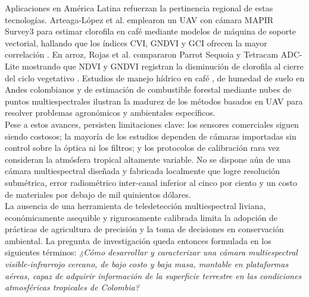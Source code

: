 \noindent Aplicaciones en América Latina refuerzan la pertinencia regional de
estas tecnologías.  Arteaga-López et al. emplearon un UAV con cámara
MAPIR Survey3 para estimar clorofila en café mediante modelos de máquina
de soporte vectorial, hallando que los índices CVI, GNDVI y GCI ofrecen
la mayor correlación \cite{Arteaga2022}.  En arroz, Rojas et al.
compararon Parrot Sequoia y Tetracam ADC-Lite mostrando que NDVI y GNDVI
registran la disminución de clorofila al cierre del ciclo
vegetativo \cite{Rojas2018Drones}.  Estudios de manejo hídrico en café
\cite{Orlando2023POTENTIALIRRIGATION}, de humedad de suelo en Andes
colombianos \cite{Casamitjana2020SoilMoisture} y de estimación de
combustible forestal mediante nubes de puntos multiespectrales
\cite{Villacres2022ConstructionAreas} ilustran la madurez de los métodos
basados en UAV para resolver problemas agronómicos y ambientales
específicos.\\

\noindent Pese a estos avances, persisten limitaciones clave: los sensores
comerciales siguen siendo costosos; la mayoría de los estudios dependen
de cámaras importadas sin control sobre la óptica ni los filtros; y los
protocolos de calibración rara vez consideran la atmósfera tropical
altamente variable.  No se dispone aún de una cámara multiespectral
diseñada y fabricada localmente que logre resolución submétrica, error
radiométrico inter-canal inferior al cinco por ciento y un costo de
materiales por debajo de mil quinientos dólares.\\

\noindent La ausencia de una herramienta de teledetección multiespectral liviana,
económicamente asequible y rigurosamente calibrada limita la adopción de
prácticas de agricultura de precisión y la toma de decisiones en
conservación ambiental.  La pregunta de investigación queda entonces
formulada en los siguientes términos: \emph{¿Cómo desarrollar y
caracterizar una cámara multiespectral visible-infrarrojo cercano, de
bajo costo y baja masa, montable en plataformas aéreas, capaz de adquirir
información de la superficie terrestre en las condiciones atmosféricas tropicales de Colombia?}\\

